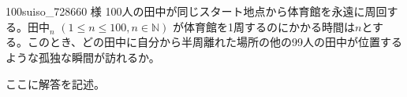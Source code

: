 \begin{thm}{100}{}{suiso\_728660 様}
 100人の田中が同じスタート地点から体育館を永遠に周回する。$\mathrm{田中}_n$ $(1\le n \le 100, n\in\mathbb{N})$ が体育館を1周するのにかかる時間は$n$とする。このとき、どの田中に自分から半周離れた場所の他の99人の田中が位置するような孤独な瞬間が訪れるか。
\end{thm}

ここに解答を記述。